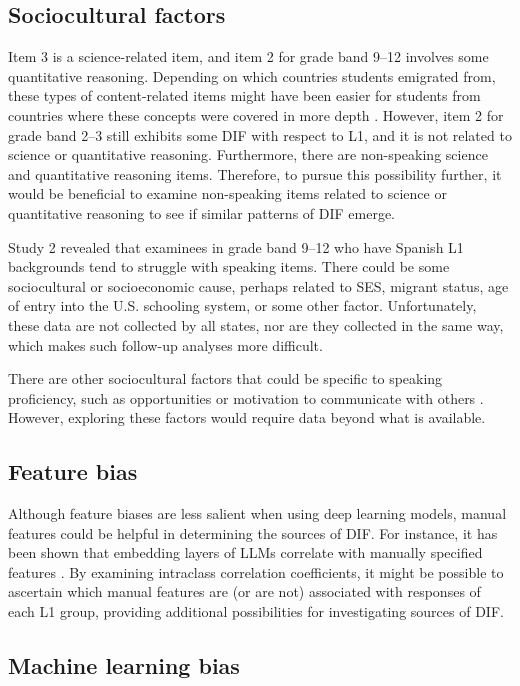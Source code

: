 \documentclass [PhD] {uclathes}
\begin{document}
\subsection{Sociocultural factors}

Item 3 is a science-related item, and item 2 for grade band 9–12 involves some quantitative reasoning. Depending on which countries students emigrated from, these types of content-related items might have been easier for students from countries where these concepts were covered in more depth \citep{huang2016exploring}. However, item 2 for grade band 2–3 still exhibits some DIF with respect to L1, and it is not related to science or quantitative reasoning. Furthermore, there are non-speaking science and quantitative reasoning items. Therefore, to pursue this possibility further, it would be beneficial to examine non-speaking items related to science or quantitative reasoning to see if similar patterns of DIF emerge. 

Study 2 revealed that examinees in grade band 9–12 who have Spanish L1 backgrounds tend to struggle with speaking items. There could be some sociocultural or socioeconomic cause, perhaps related to SES, migrant status, age of entry into the U.S. schooling system, or some other factor. Unfortunately, these data are not collected by all states, nor are they collected in the same way, which makes such follow-up analyses more difficult. 

There are other sociocultural factors that could be specific to speaking proficiency, such as opportunities or motivation to communicate with others \citep{derwing2013development}. However, exploring these factors would require data beyond what is available. 

\subsection{Feature bias}

Although feature biases are less salient when using deep learning models, manual features could be helpful in determining the sources of DIF. For instance, it has been shown that embedding layers of LLMs correlate with manually specified features \citep{ormerod2022mapping}. By examining intraclass correlation coefficients, it might be possible to ascertain which manual features are (or are not) associated with responses of each L1 group, providing additional possibilities for investigating sources of DIF. 

\subsection{Machine learning bias}
\end{document}
